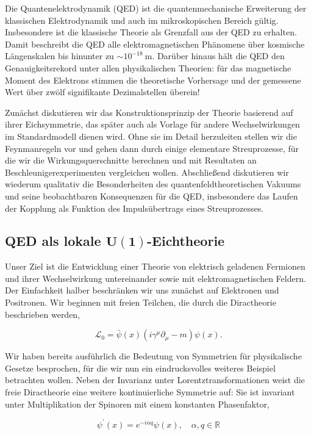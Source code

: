 \documentclass[10pt, letterpaper]{article}
\begin{document}
Die Quantenelektrodynamik (QED) ist die quantenmechanische Erweiterung der klassischen Elektrodynamik und auch im mikroskopischen Bereich gültig. Insbesondere ist die klassische Theorie als Grenzfall aus der QED zu erhalten. Damit beschreibt die QED alle elektromagnetischen Phänomene über kosmische Längenskalen bis hinunter zu $\sim 10^{-18} \mathrm{~m}$. Darüber hinaus hält die QED den Genauigkeitsrekord unter allen physikalischen Theorien: für das magnetische Moment des Elektrons stimmen die theoretische Vorhersage und der gemessene Wert über zwölf signifikante Dezimalstellen überein!

Zunächst diskutieren wir das Konstruktionsprinzip der Theorie basierend auf ihrer Eichsymmetrie, das später auch als Vorlage für andere Wechselwirkungen im Standardmodell dienen wird. Ohne sie im Detail herzuleiten stellen wir die Feynmanregeln vor und gehen dann durch einige elementare Streuprozesse, für die wir die Wirkungsquerschnitte berechnen und mit Resultaten an Beschleunigerexperimenten vergleichen wollen. Abschließend diskutieren wir wiederum qualitativ die Besonderheiten des quantenfeldtheoretischen Vakuums und seine beobachtbaren Konsequenzen für die QED, insbesondere das Laufen der Kopplung als Funktion des Impulsübertrags eines Streuprozesses.

\subsection*{QED als lokale $\boldsymbol{U}(\mathbf{1})$-Eichtheorie}
Unser Ziel ist die Entwicklung einer Theorie von elektrisch geladenen Fermionen und ihrer Wechselwirkung untereinander sowie mit elektromagnetischen Feldern. Der Einfachkeit halber beschränken wir uns zunächst auf Elektronen und Positronen. Wir beginnen mit freien Teilchen, die durch die Diractheorie beschrieben werden,

$$
\mathscr{L}_{0}=\bar{\psi}(x)\left(i \gamma^{\mu} \partial_{\mu}-m\right) \psi(x) .
$$

Wir haben bereits ausführlich die Bedeutung von Symmetrien für physikalische Gesetze besprochen, für die wir nun ein eindrucksvolles weiteres Beispiel betrachten wollen. Neben der Invarianz unter Lorentztransformationen weist die freie Diractheorie eine weitere kontinuierliche Symmetrie auf: Sie ist invariant unter Multiplikation der Spinoren mit einem konstanten Phasenfaktor,

$$
\psi^{\prime}(x)=e^{-i \alpha q} \psi(x), \quad \alpha, q \in \mathbb{R}
$$
\end{document}
